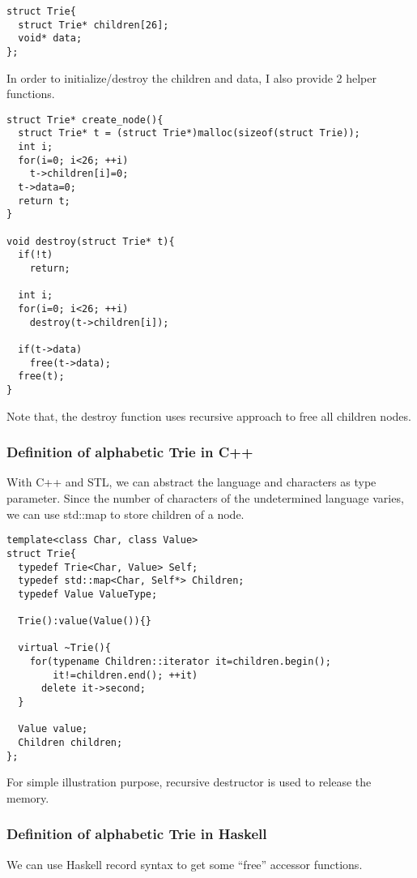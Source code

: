 \documentclass{article}
\begin{document}
\lstset{language=C}
\begin{lstlisting}
struct Trie{
  struct Trie* children[26];
  void* data;
};
\end{lstlisting}

In order to initialize/destroy the children and data, I also provide 2 helper
functions.

\begin{lstlisting}
struct Trie* create_node(){
  struct Trie* t = (struct Trie*)malloc(sizeof(struct Trie));
  int i;
  for(i=0; i<26; ++i)
    t->children[i]=0;
  t->data=0;
  return t;
}

void destroy(struct Trie* t){
  if(!t)
    return;

  int i;
  for(i=0; i<26; ++i)
    destroy(t->children[i]);

  if(t->data)
    free(t->data);
  free(t);
}
\end{lstlisting}

Note that, the destroy function uses recursive approach to free all
children nodes.

\subsubsection*{Definition of alphabetic Trie in C++}

With C++ and STL, we can abstract the language and characters as type
parameter. Since the number of characters of the undetermined language varies, we
can use std::map to store children of a node.

\lstset{language=C++}
\begin{lstlisting}
template<class Char, class Value>
struct Trie{
  typedef Trie<Char, Value> Self;
  typedef std::map<Char, Self*> Children;
  typedef Value ValueType;

  Trie():value(Value()){}

  virtual ~Trie(){
    for(typename Children::iterator it=children.begin();
        it!=children.end(); ++it)
      delete it->second;
  }

  Value value;
  Children children;
};
\end{lstlisting}

For simple illustration purpose, recursive destructor is used to
release the memory.

\subsubsection*{Definition of alphabetic Trie in Haskell}
We can use Haskell record syntax to get some ``free'' accessor
functions\cite{wiki-trie}. 
\end{document}
